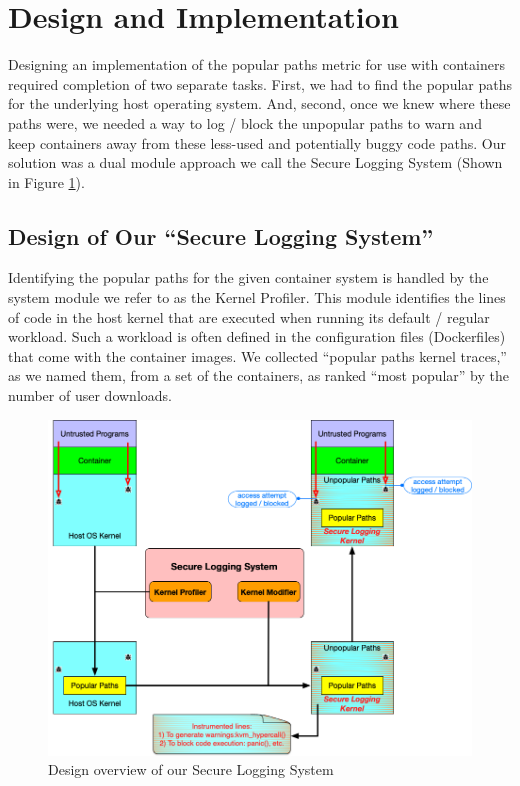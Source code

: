 \section{Design and Implementation}
\label{sec.design}

Designing an implementation of the popular paths metric for use with containers required completion of two separate tasks. 
First, we had to find the popular paths for the underlying host operating system. 
And, second, once we knew where these paths were, we needed a way to log / block the unpopular paths to warn and keep containers away from these less-used and potentially buggy code paths. 
Our solution was a dual module approach we call the Secure Logging System (Shown in Figure \ref{fig:design}). 

\subsection{Design of Our ``Secure Logging System''}
\label{sec.design.secure_logging_system}
Identifying the popular paths for the given container system is handled by the system module we refer to as the Kernel Profiler. 
This module identifies the lines of code in the host kernel that are executed when running its default / regular workload. 
Such a workload is often defined in the configuration files (Dockerfiles) that come with the container images. 
We collected  ``popular paths kernel traces,'' as we named them, from a set of the containers, as  ranked ``most popular'' by the number of user downloads. 

\begin{figure}
\centering
\includegraphics[width=1.5\columnwidth]{diagram/design.png}
\caption{\small Design overview of our Secure Logging System}
\label{fig:design}
\end{figure}

